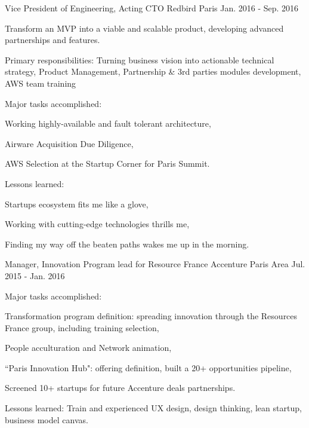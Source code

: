 \begin{cventries}
  \cventry
    {Vice President of Engineering, Acting CTO} %
    {Redbird} %
    {Paris} %
    {Jan. 2016 - Sep. 2016} %
    {
      \begin{cvitems} %
        \item {Transform an MVP into a viable and scalable product, developing advanced partnerships and features.}
        \item {Primary responsibilities: Turning business vision into actionable technical strategy, Product Management, Partnership \& 3rd parties modules development, AWS team training} %
        \item {Major tasks accomplished:}
        \begin{cvsubitems}
          \item {Working highly-available and fault tolerant architecture,}
          \item {Airware Acquisition Due Diligence,}
          \item {AWS Selection at the Startup Corner for Paris Summit.}
        \end{cvsubitems}
        \item {Lessons learned:}
        \begin{cvsubitems}
          \item {Startups ecosystem fits me like a glove,}
          \item {Working with cutting-edge technologies thrills me,}
          \item {Finding my way off the beaten paths wakes me up in the morning.}
        \end{cvsubitems}
      \end{cvitems}
    }

  \cventry
    {Manager, Innovation Program lead for Resource France} %
    {Accenture} %
    {Paris Area} %
    {Jul. 2015 - Jan. 2016} %
    {
      \begin{cvitems} %
        \item {Major tasks accomplished:}
        \begin{cvsubitems}
          \item {Transformation program definition: spreading innovation through the Resources France group, including training selection,}
          \item {People acculturation and Network animation,}
          \item {``Paris Innovation Hub": offering definition, built a 20+ opportunities pipeline,}
          \item {Screened 10+ startups for future Accenture deals partnerships.}
        \end{cvsubitems}
        \item {Lessons learned: Train and experienced UX design, design thinking, lean startup, business model canvas.}
      \end{cvitems}
    }


\end{cventries}
